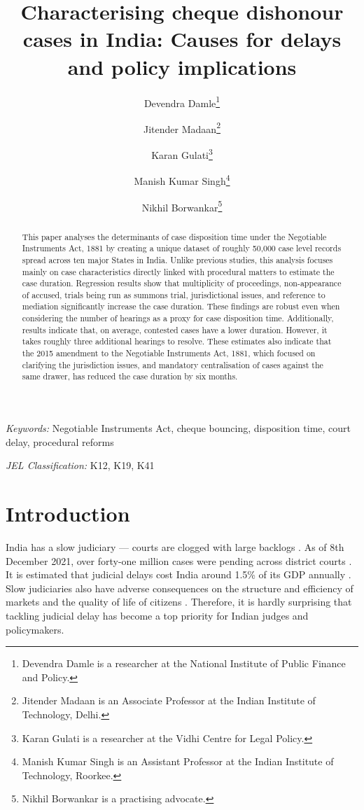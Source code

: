 \documentclass[12pt,a4paper]{article}
\title{Characterising cheque dishonour cases in India: Causes for delays and policy implications}
\author{Devendra Damle\thanks{Devendra Damle is a researcher at the National Institute of Public Finance and Policy.} \and Jitender Madaan\thanks{Jitender Madaan is an Associate Professor at the Indian Institute of Technology, Delhi.} \and Karan Gulati\thanks{Karan Gulati is a researcher at the Vidhi Centre for Legal Policy.} \and Manish Kumar Singh\thanks{Manish Kumar Singh is an Assistant Professor at the Indian Institute of Technology, Roorkee.} \and Nikhil Borwankar\thanks{Nikhil Borwankar is a practising advocate.}}
\begin{document}
\maketitle

\begin{abstract}

This paper analyses the determinants of case disposition time under the Negotiable Instruments Act, 1881 by creating a unique dataset of roughly 50,000 case level records spread across ten major States in India. Unlike previous studies, this analysis focuses mainly on case characteristics directly linked with procedural matters to estimate the case duration. Regression results show that multiplicity of proceedings, non-appearance of accused, trials being run as summons trial, jurisdictional issues, and reference to mediation significantly increase the case duration. These findings are robust even when considering the number of hearings as a proxy for case disposition time. Additionally, results indicate that, on average, contested cases have a lower duration. However, it takes roughly three additional hearings to resolve. These estimates also indicate that the 2015 amendment to the Negotiable Instruments Act, 1881, which focused on clarifying the jurisdiction issues, and mandatory centralisation of cases against the same drawer, has reduced the case duration by six months.

\end{abstract}

\textit{Keywords: } Negotiable Instruments Act, cheque bouncing, disposition time, court delay, procedural reforms

\textit{JEL Classification:} K12, K19, K41

\newpage
\tableofcontents

\newpage
\section{Introduction}
\label{sec:introduction}

India has a slow judiciary --- courts are clogged with large backlogs \autocite{moog1992delays, debroy2008justice, dutta2019modernise}. As of 8th December 2021, over forty-one million cases were pending across district courts \autocite{njdg2021}. It is estimated that judicial delays cost India around 1.5\% of its GDP annually \autocite{dey2016_cost}. Slow judiciaries also have adverse consequences on the structure and efficiency of markets and the quality of life of citizens \autocite{world2004world, chemin2007impact, rao2020institutional}. Therefore, it is hardly surprising that tackling judicial delay has become a top priority for Indian judges and policymakers.
\end{document}
